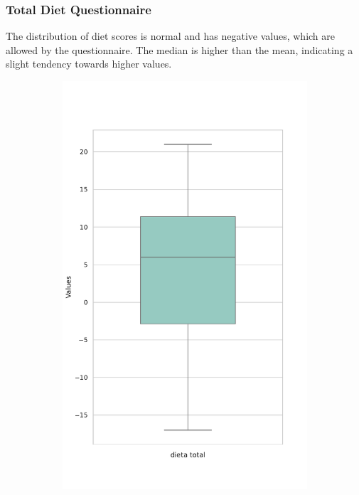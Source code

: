 \documentclass[jou]{apa7}
\newcommand{\subfigwidth}{0.2\textwidth}
\begin{document}
\subsubsection{Total Diet Questionnaire}
The distribution of diet scores is normal and has negative values, which are allowed by the questionnaire. The median is higher than the mean, indicating a slight tendency towards higher values.


\begin{figure}[!ht]
	\centering
	\begin{subfigure}[b]{\subfigwidth}
		\centering
		\includegraphics[width=\linewidth]{Box_Plot_of_dieta_total.pdf}

\end{subfigure}
\end{figure}
\end{document}
